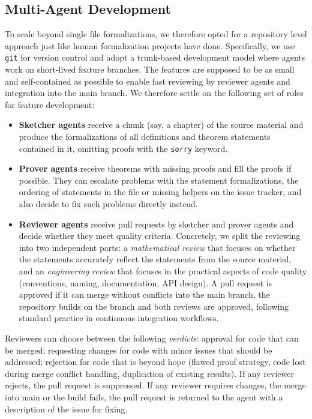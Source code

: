 \documentclass[]{fairmeta}
\begin{document}
\subsection{Multi-Agent Development}
\label{sec:dev-agents}
To scale beyond single file formalizations, we therefore opted for a repository level approach just like human formalization projects have done. Specifically, we use \texttt{git} for version control and adopt a trunk-based development model where agents work on short-lived feature branches. The features are supposed to be as small and self-contained as possible to enable fast reviewing by reviewer agents and integration into the main branch.
We therefore settle on the following set of roles for feature development:
\begin{itemize}
    \item \textbf{Sketcher agents} receive a chunk (say, a chapter) of the source material and produce the formalizations of all definitions and theorem statements contained in it, omitting proofs with the \texttt{sorry} keyword. 
    \item \textbf{Prover agents} receive theorems with missing proofs and fill the proofs if possible. They can escalate problems with the statement formalizations, the ordering of statements in the file or missing helpers on the issue tracker, and also decide to fix such problems directly instead.
    \item \textbf{Reviewer agents} receive pull requests by sketcher and prover agents and decide whether they meet quality criteria. Concretely, we split the reviewing into two independent parts: a \emph{mathematical review} that focuses on whether the statements accurately reflect the statements from the source material, and an \emph{engineering review} that focuses in the practical aspects of code quality (conventions, naming, documentation, API design). A pull request is approved if it can merge without conflicts into the main branch, the repository builds on the branch and both reviews are approved, following standard practice in continuous integration workflows.
\end{itemize}
Reviewers can choose between the following \emph{verdicts}: approval for code that can be merged; requesting changes for code with minor issues that should be addressed; rejection for code that is beyond hope (flawed proof strategy, code lost during merge conflict handling, duplication of existing results). If any reviewer rejects, the pull request is suppressed. If any reviewer requires changes, the merge into main or the build fails, the pull request is returned to the agent with a description of the issue for fixing.
\end{document}
